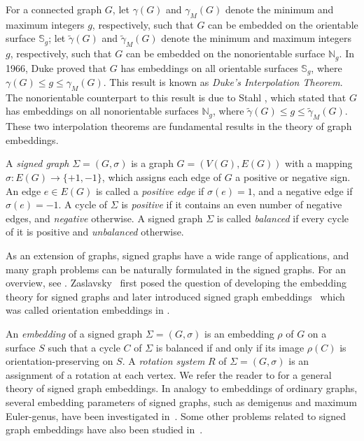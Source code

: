 \documentclass[12pt]{article}
\theoremstyle{definition}
\begin{document}
For a connected graph $G$, let $\gamma(G)$ and $\gamma_{M}(G)$ denote the minimum and maximum integers $g$, respectively, such that $G$ can be embedded on the orientable surface $\mathbb{S}_g$; let $\tilde{\gamma}(G)$ and $\tilde{\gamma}_{M}(G)$ denote the minimum and maximum integers $g$, respectively, such that $G$ can be embedded on the nonorientable surface $\mathbb{N}_g$. In 1966, Duke \cite{Duke1966} proved that $G$ has embeddings on all orientable surfaces $\mathbb{S}_{g}$, where $\gamma(G)\leq g\leq \gamma_{M}(G)$. This result is known as {\it Duke's Interpolation Theorem}. The nonorientable counterpart to this result is due to Stahl \cite{Stahl1978}, which stated that $G$ has embeddings on all nonorientable surfaces $\mathbb{N}_{g}$, where $\tilde{\gamma}(G)\leq g\leq \tilde{\gamma}_{M}(G)$. These two interpolation theorems are fundamental results in the theory of graph embeddings.

A {\it signed graph} $\Sigma=(G,\sigma)$ is a graph $G=(V(G), E(G))$  with a mapping $\sigma:E(G)\longrightarrow\{+1,-1\}$, which assigns each edge of $G$ a positive or negative sign.  An edge $e\in E(G)$ is called a {\it positive edge} if $\sigma(e)=1$, and a negative edge if $\sigma(e)=-1$.
A cycle of $\Sigma$ is {\it positive} if it contains an even number of negative edges, and {\it negative} otherwise.
A signed graph $\Sigma$ is called {\it balanced} if every cycle of it is positive and {\it unbalanced} otherwise.

As an extension of graphs, signed graphs have a wide range of applications, and many graph problems can be naturally formulated in the signed graphs. For an overview, see \cite{Zaslavsky1998}.  Zaslavsky~\cite{Zaslavsky1981} first posed the question of developing the embedding theory for signed graphs and later introduced signed graph embeddings~\cite{Zaslavsky1992} which was called orientation embeddings in \cite{Zaslavsky1992}.

An {\it embedding}  of a signed graph $\Sigma=(G,\sigma)$ is an embedding $\rho$ of $G$ on a surface $S$ such that a cycle $C$ of $\Sigma$ is balanced if and only if its image $\rho(C)$ is orientation-preserving on $S$.   A {\it rotation system} $R$ of  $\Sigma=(G,\sigma)$ is an assignment of a rotation at each vertex. We refer the reader to \cite{Zaslavsky1992} for a general theory of signed graph embeddings. In analogy to embeddings of ordinary graphs, several embedding parameters of signed graphs, such as demigenus and maximum Euler-genus, have been investigated in~\cite{Lv2015,Lv2018,SiranSkoviera1991,Zaslavsky1997,Zaslavsky2001}. Some other problems related to signed graph embeddings have also been studied in~\cite{Siran1991-1,Zaslavsky1993,Zaslavsky1996,Zaslavsky1997-1}.
\end{document}
